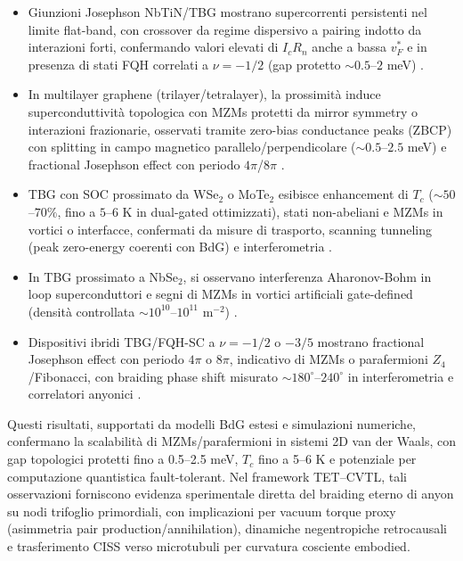 \documentclass[11pt,a4paper]{article}
\let\oldcite\cite
\renewcommand{\cite}{\protect\oldcite}
\theoremstyle{plain}
\theoremstyle{definition}
\begin{document}
\begin{itemize}
    \item Giunzioni Josephson NbTiN/TBG mostrano supercorrenti persistenti nel limite flat-band, con crossover da regime dispersivo a pairing indotto da interazioni forti, confermando valori elevati di $I_c R_n$ anche a bassa $v_F^*$ e in presenza di stati FQH correlati a $\nu = -1/2$ (gap protetto $\sim 0.5$--$2$ meV) \cite{DiezCarlon2025}.
    \item In multilayer graphene (trilayer/tetralayer), la prossimità induce superconduttività topologica con MZMs protetti da mirror symmetry o interazioni frazionarie, osservati tramite zero-bias conductance peaks (ZBCP) con splitting in campo magnetico parallelo/perpendicolare ($\sim 0.5$--$2.5$ meV) e fractional Josephson effect con periodo $4\pi$/$8\pi$ \cite{Phong2023, Phong2024, Zeng2025}.
    \item TBG con SOC prossimato da WSe$_2$ o MoTe$_2$ esibisce enhancement di $T_c$ ($\sim 50$--$70\%$, fino a $5$--$6$ K in dual-gated ottimizzati), stati non-abeliani e MZMs in vortici o interfacce, confermati da misure di trasporto, scanning tunneling (peak zero-energy coerenti con BdG) e interferometria \cite{Bhowmik2023, Bourrellier2026}.
    \item In TBG prossimato a NbSe$_2$, si osservano interferenza Aharonov-Bohm in loop superconduttori e segni di MZMs in vortici artificiali gate-defined (densità controllata $\sim 10^{10}$--$10^{11}$ m$^{-2}$) \cite{Stepanov2024}.
    \item Dispositivi ibridi TBG/FQH-SC a $\nu = -1/2$ o $-3/5$ mostrano fractional Josephson effect con periodo $4\pi$ o $8\pi$, indicativo di MZMs o parafermioni $Z_4$/Fibonacci, con braiding phase shift misurato $\sim 180^\circ$--$240^\circ$ in interferometria e correlatori anyonici \cite{Zeng2023, Liu2025, Bourrellier2026}.
\end{itemize}

Questi risultati, supportati da modelli BdG estesi e simulazioni numeriche, confermano la scalabilità di MZMs/parafermioni in sistemi 2D van der Waals, con gap topologici protetti fino a 0.5--2.5 meV, $T_c$ fino a 5--6 K e potenziale per computazione quantistica fault-tolerant. Nel framework TET--CVTL, tali osservazioni forniscono evidenza sperimentale diretta del braiding eterno di anyon su nodi trifoglio primordiali, con implicazioni per vacuum torque proxy (asimmetria pair production/annihilation), dinamiche negentropiche retrocausali e trasferimento CISS verso microtubuli per curvatura cosciente embodied.
\end{document}
